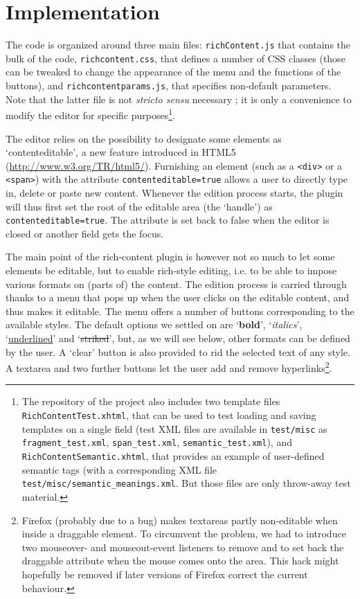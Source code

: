 \documentclass[11pt,a4paper]{article}
\begin{document}
\section{Implementation}

The code is organized around three main files: \texttt{richContent.js} that contains the bulk of the code, \texttt{richcontent.css}, that defines a number of CSS classes (those can be tweaked to change the appearance of the menu and the functions of the buttons), and \texttt{richcontentparams.js}, that specifies non-default parameters. Note that the latter file is not \textit{stricto sensu} necessary ; it is only a convenience to modify the editor for specific purposes\footnote{The repository of the project also includes two template files \texttt{RichContentTest.xhtml}, that can be used to test loading and saving templates on a single field (test XML files are available in \texttt{test/misc} as \texttt{fragment\_test.xml}, \texttt{span\_test.xml}, \texttt{semantic\_test.xml}), and \texttt{RichContentSemantic.xhtml}, that provides an example of user-defined semantic tags (with a corresponding XML file \texttt{test/misc/semantic\_meanings.xml}. But those files are only throw-away test material.}.

The editor relies on the possibility to designate some elements as `contenteditable', a new feature introduced in HTML5 (\url{http://www.w3.org/TR/html5/}). Furnishing an element (such as a \texttt{<div>} or a \texttt{<span>}) with the attribute \texttt{contenteditable=true} allows a user to directly type in, delete or paste new content. Whenever the edition process starts, the plugin will thus first set the root of the editable area (the `handle') as \texttt{contenteditable=true}. The attribute is set back to false when the editor is closed or another field gets the focus.

The main point of the rich-content plugin is however not so much to let some elements be editable, but to enable rich-style editing, i.e. to be able to impose various formats on (parts of) the content. The edition process is carried through thanks to a menu that pops up when the user clicks on the editable content, and thus makes it editable. The menu offers a number of buttons corresponding to the available styles. The default options we settled on are `\textbf{bold}', `\textit{italics}', `\underline{underlined}' and `\sout{striked}', but, as we will see below, other formats can be defined by the user. A `clear' button is also provided to rid the selected text of any style. A textarea and two further buttons let the user add and remove hyperlinks\footnote{Firefox (probably due to a bug) makes textareas partly non-editable when inside a draggable element. To circumvent the problem, we had to introduce two mouseover- and mouseout-event listeners to remove and to set back the draggable attribute when the mouse comes onto the area. This hack might hopefully be removed if later versions of Firefox correct the current behaviour.}.
\end{document}
